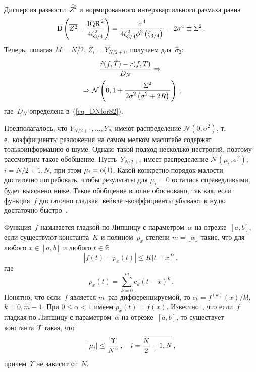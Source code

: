 \begin{multicols}{2}
Дисперсия разности~$\overline{Z^2}$ и нормированного интерквартильного размаха равна
\begin{equation*}
\textrm{D}\left(\overline{Z^2}-\displaystyle\frac{\displaystyle \mathrm{IQR}^2\mathstrut}{\displaystyle 4\zeta_{3/4}^2\mathstrut}\right)=
\displaystyle\frac{\displaystyle \sigma^4\mathstrut}{\displaystyle 4\zeta_{3/4}^2\phi^2\left(\zeta_{3/4}\right)\mathstrut}-2\sigma^4\equiv\Sigma^2\,.
\end{equation*}
Теперь, полагая $M=N/2$, $Z_i=Y_{N/2+i}$, получаем для~$\hat\sigma_2$:
\begin{multline}
\label{eq_weaklimriskIQR}
\displaystyle\frac{\displaystyle \hat{r}(f,\hat{T})-r(f,T)\mathstrut}{\displaystyle D_N\mathstrut}\Rightarrow{}\\
{}\Rightarrow \mathcal{N}\left(0,1+\displaystyle\frac{\displaystyle \Sigma^2\mathstrut}{\displaystyle 2\sigma^2\left(\sigma^2+2R\right)\mathstrut}\right)\,,
\end{multline}
где~$D_N$ определена в~(\ref{eq_DNforS2}).

Предполагалось, что $Y_{N/2+1},\ldots,Y_N$ имеют распределение 
$\mathcal{N}\left(0,\sigma^2\right)$, т.\,е.\ коэффициенты разложения на самом 
мелком масштабе содержат только\linebreak информацию о шуме. Однако такой подход несколько 
нестрогий, поэтому рассмотрим такое обобщение. Пусть~$Y_{N/2+i}$ имеет распределение 
$\mathcal{N}\left(\mu_i,\sigma^2\right)$, $i=\overline{N/2+1,N}$, при этом $\mu_i=\textrm{o}(1)$. 
Какой конкретно порядок малости достаточно потребовать, чтобы результаты для $\mu_i=0$ 
остались справедливыми, будет выяснено ниже. Такое обобщение вполне обосновано, так как, если функция~$f$ 
достаточно гладкая, вейвлет-коэффициенты убывают к нулю достаточно быстро~\cite{3mar}.

Функция~$f$ называется гладкой по Липшицу с параметром~$\alpha$ на от\-рез\-ке~$[a,b]$, 
если существуют константа~$K$ и полином~$p_x$ степени $m=\lfloor\alpha\rfloor$ такие, 
что для любого $x\in[a,b]$ и любого $t\in\mathbb{R}$
\begin{equation*}
\left| f(t)-p_x(t) \right|\leq K|t-x|^\alpha\,,
\end{equation*}
где
\begin{equation*}
p_x(t)=\sum\limits_{k=0}^{m}c_k(t-x)^k\,.
\end{equation*}
Понятно, что если~$f$ является $m$~раз дифференцируемой, то 
$c_k=f^{(k)}(x)/k!$, $k=\overline{0,m-1}$. 
При $0\leq\alpha<1$ имеем $p_x(t)=f(x)$. Известно~\cite{3mar}, что если~$f$ гладкая по 
Липшицу с параметром~$\alpha$ на отрезке~$[a,b]$, то существует константа~$\Upsilon$ такая, что
\begin{equation}
\label{eq_aiBound}
|\mu_i|\leq\displaystyle\frac{\displaystyle \Upsilon\mathstrut}{\displaystyle N^{\alpha}\mathstrut}\,,\quad i=\overline{\displaystyle\frac{\displaystyle N\mathstrut}{\displaystyle 2\mathstrut}+1,N}\,,
\end{equation}
причем~$\Upsilon$ не зависит от~$N$.


\end{multicols}
